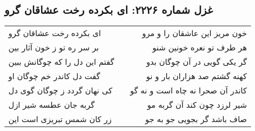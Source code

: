 \begin{center}
\section*{غزل شماره ۲۲۲۶: ای بکرده رخت عشاقان گرو}
\label{sec:2226}
\begin{longtable}{l p{0.5cm} r}
ای بکرده رخت عشاقان گرو
&&
خون مریز این عاشقان را و مرو
\\
بر سر ره تو ز خون آثار بین
&&
هر طرف تو نعره خونین شنو
\\
گفتم این دل را که چوگانش ببین
&&
گر یکی گویی در آن چوگان بدو
\\
گفت دل کاندر خم چوگان او
&&
کهنه گشتم صد هزاران بار و نو
\\
کی نهان گردد ز چوگان گوی دل
&&
کاندر آن صحرا نه چاه است و نه گو
\\
گربه جان عطسه شیر ازل
&&
شیر لرزد چون کند آن گربه مو
\\
زر کان شمس تبریزی است این
&&
صاف باشد گر بجویی جو به جو
\\
\end{longtable}
\end{center}

